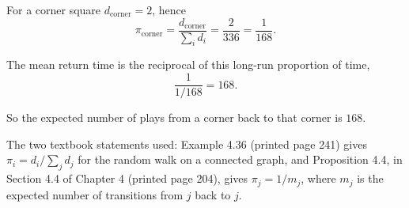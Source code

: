 \documentclass[11pt]{article}
\begin{document}
For a corner square $d_{\text{corner}}=2$, hence
\[
\pi_{\text{corner}}=\frac{d_{\text{corner}}}{\sum_i d_i}=\frac{2}{336}=\frac{1}{168}.
\]

The mean return time is the reciprocal of this long-run proportion of time,
\[
\frac{1}{1/168}=168.
\]

So the expected number of plays from a corner back to that corner is $168$.

The two textbook statements used: Example 4.36 (printed page 241) gives $\pi_i=d_i/\sum_j d_j$ for the random walk on a connected graph, and Proposition 4.4, in Section 4.4 of Chapter 4 (printed page 204), gives $\pi_j=1/m_j$, where $m_j$ is the expected number of transitions from $j$ back to $j$.
\end{document}
